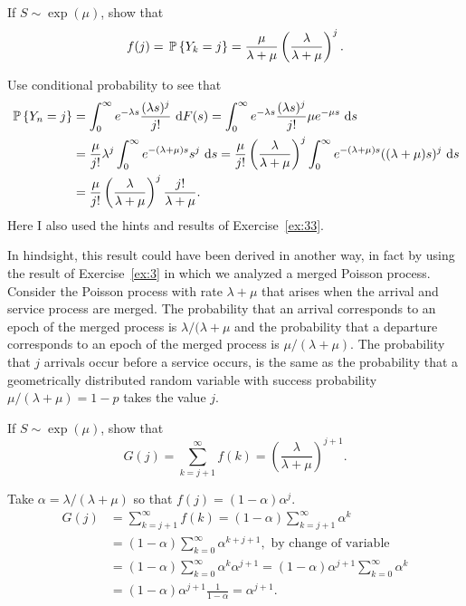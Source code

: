 \begin{question}
 If $S\sim \exp(\mu)$, show that 
  \begin{equation} \label{eq:41}
f(j) = \P{Y_k = j} = \frac{\mu}{\lambda+\mu}\left(\frac{\lambda}{\lambda+\mu}\right)^j.
  \end{equation}
  \begin{solution}
Use conditional probability to see that 
\begin{equation*}
  \begin{split}
  \P{Y_n = j} 
&= \int_0^\infty e^{-\lambda s}\frac{(\lambda s)^j}{j!}\, \d F(s) = \int_0^\infty e^{-\lambda s}\frac{(\lambda s)^j}{j!} \mu e^{-\mu s}\, \d s \\
&= \frac{\mu}{j!}\lambda^j \int_0^\infty e^{-(\lambda+\mu) s}s^j\,\d s = \frac{\mu}{j!}\left(\frac{\lambda}{\lambda+\mu}\right)^j \int_0^\infty e^{-(\lambda+\mu) s}((\lambda+\mu)s)^j\,\d s \\
&= \frac{\mu}{j!}\left(\frac{\lambda}{\lambda+\mu}\right)^j \frac{j!}{\lambda+\mu}.
\end{split}
\end{equation*}
Here I also used the hints and  results of Exercise~\ref{ex:33}.

In hindsight, this result could have been derived in another way, in
fact by using the result of Exercise~\ref{ex:3} in which we analyzed a
merged Poisson process. Consider the Poisson process with rate
$\lambda+\mu$ that arises when the arrival and service process are
merged. The probability that an arrival corresponds to an epoch of the
merged process is $\lambda/(\lambda+\mu$ and the probability that a
departure corresponds to an epoch of the merged process is
$\mu/(\lambda+\mu)$.  The probability that $j$ arrivals occur before a
service occurs, is the same as the probability that a geometrically
distributed random variable with success probability
$\mu/(\lambda+\mu) = 1-p$ takes the value $j$.
  \end{solution}
\end{question}

\begin{question}
 If $S\sim \exp(\mu)$, show that 
  \begin{equation}
G(j) = \sum_{k=j+1}^\infty f(k) =  \left(\frac{\lambda}{\lambda+\mu}\right)^{j+1}.
  \end{equation}
\begin{solution}
  Take $\alpha = \lambda/(\lambda+\mu)$ so that
  $f(j) = (1-\alpha) \alpha^j$.
\begin{equation*}
  \begin{split}
  G(j) 
&= \sum_{k=j+1}^\infty f(k)  = (1-\alpha) \sum_{k=j+1}^\infty \alpha^k \\
& = (1-\alpha) \sum_{k=0}^\infty \alpha^{k+j+1}, \text{ by change of variable}\\
& = (1-\alpha) \sum_{k=0}^\infty \alpha^{k}\alpha^{j+1}= (1-\alpha)\alpha^{j+1} \sum_{k=0}^\infty \alpha^k \\
&= (1-\alpha)\alpha^{j+1} \frac{1}{1-\alpha} = \alpha^{j+1}.
  \end{split}
\end{equation*}
    \end{solution}
\end{question}


